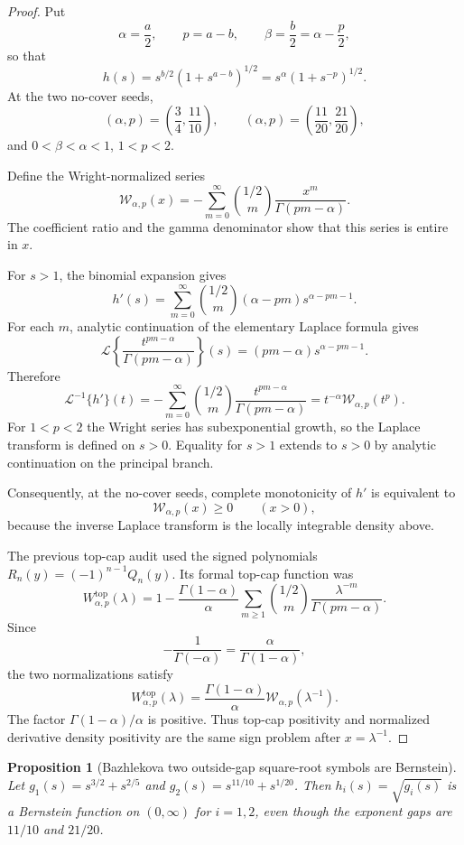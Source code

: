 \documentclass[11pt]{article}
\numberwithin{equation}{section}
\newtheorem{proposition}[theorem]{Proposition}
\theoremstyle{definition}
\theoremstyle{remark}
\newcommand{\1}{\mathbf 1}
\begin{document}
\begin{proof}
Put
\[
\alpha=\frac a2,\qquad p=a-b,\qquad \beta=\frac b2=\alpha-\frac p2,
\]
so that
\[
h(s)=s^{b/2}(1+s^{a-b})^{1/2}
=s^\alpha(1+s^{-p})^{1/2}.
\]
At the two no-cover seeds,
\[
(\alpha,p)=\left(\frac34,\frac{11}{10}\right),
\qquad
(\alpha,p)=\left(\frac{11}{20},\frac{21}{20}\right),
\]
and \(0<\beta<\alpha<1\), \(1<p<2\).

Define the Wright-normalized series
\[
\mathcal W_{\alpha,p}(x)
=
-\sum_{m=0}^{\infty}
\binom{1/2}{m}\frac{x^m}{\Gamma(pm-\alpha)}.
\]
The coefficient ratio and the gamma denominator show that this series is entire in \(x\).

For \(s>1\), the binomial expansion gives
\[
h'(s)
=
\sum_{m=0}^{\infty}
\binom{1/2}{m}(\alpha-pm)s^{\alpha-pm-1}.
\]
For each \(m\), analytic continuation of the elementary Laplace formula gives
\[
\mathcal L\left\{
\frac{t^{pm-\alpha}}{\Gamma(pm-\alpha)}
\right\}(s)
=(pm-\alpha)s^{\alpha-pm-1}.
\]
Therefore
\[
\mathcal L^{-1}\{h'\}(t)
=
-\sum_{m=0}^{\infty}
\binom{1/2}{m}
\frac{t^{pm-\alpha}}{\Gamma(pm-\alpha)}
=
t^{-\alpha}\mathcal W_{\alpha,p}(t^p).
\]
For \(1<p<2\) the Wright series has subexponential growth, so the Laplace transform is defined on \(s>0\). Equality for \(s>1\) extends to \(s>0\) by analytic continuation on the principal branch.

Consequently, at the no-cover seeds, complete monotonicity of \(h'\) is equivalent to
\[
\mathcal W_{\alpha,p}(x)\ge0
\qquad(x>0),
\]
because the inverse Laplace transform is the locally integrable density above.

The previous top-cap audit used the signed polynomials \(R_n(y)=(-1)^{n-1}Q_n(y)\). Its formal top-cap function was
\[
W^{\mathrm{top}}_{\alpha,p}(\lambda)
=
1-\frac{\Gamma(1-\alpha)}{\alpha}
\sum_{m\ge1}\binom{1/2}{m}
\frac{\lambda^{-m}}{\Gamma(pm-\alpha)}.
\]
Since
\[
-\frac1{\Gamma(-\alpha)}
=\frac{\alpha}{\Gamma(1-\alpha)},
\]
the two normalizations satisfy
\[
W^{\mathrm{top}}_{\alpha,p}(\lambda)
=
\frac{\Gamma(1-\alpha)}{\alpha}
\mathcal W_{\alpha,p}(\lambda^{-1}).
\]
The factor \(\Gamma(1-\alpha)/\alpha\) is positive. Thus top-cap positivity and normalized derivative density positivity are the same sign problem after \(x=\lambda^{-1}\).
\end{proof}

\begin{proposition}[Bazhlekova two outside-gap square-root symbols are Bernstein]
\label{res:bazhlekova-twoseed-sqrtbf-outsidegap}
Let \(g_1(s)=s^{3/2}+s^{2/5}\) and \(g_2(s)=s^{11/10}+s^{1/20}\). Then \(h_i(s)=\sqrt{g_i(s)}\) is a Bernstein function on \((0,\infty)\) for \(i=1,2\), even though the exponent gaps are \(11/10\) and \(21/20\).
\end{proposition}
\end{document}
